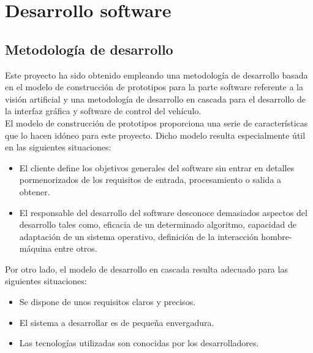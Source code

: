 

\chapter{Desarrollo software}
\label{chap:desarrollo-software}

\section{Metodología de desarrollo}

Este proyecto ha sido obtenido empleando una metodología de desarrollo basada en el modelo de construcción de prototipos para la parte software referente a la visión artificial y una metodología de desarrollo en cascada para el desarrollo de la interfaz gráfica y software de control del vehículo.\\

El modelo de construcción de prototipos proporciona una serie de características que lo hacen idóneo para este proyecto. Dicho modelo resulta especialmente útil en las siguientes situaciones:

\begin{itemize}
\item El cliente define los objetivos generales del software sin entrar en detalles pormenorizados de los requisitos de entrada, procesamiento o salida a obtener.
\item El responsable del desarrollo del software desconoce demasiados aspectos del desarrollo tales como, eficacia de un determinado algoritmo, capacidad de adaptación de un sistema operativo, definición de la interacción hombre-máquina entre otros.
\end{itemize}

Por otro lado, el modelo de desarrollo en cascada resulta adecuado para las siguientes situaciones:

\begin{itemize}
\item Se dispone de unos requisitos claros y precisos.
\item El sistema a desarrollar es de pequeña envergadura.
\item Las tecnologías utilizadas son conocidas por los desarrolladores.
\end{itemize}

